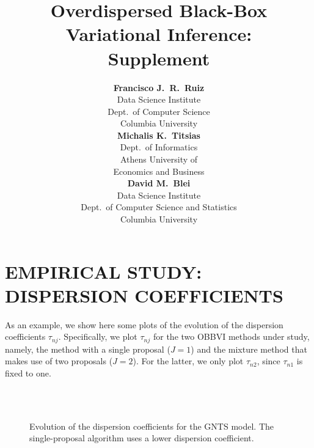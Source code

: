 \documentclass[]{article}
\title{Overdispersed Black-Box Variational Inference:\\Supplement}
\author{%
{\bf Francisco J.~R.~Ruiz} \\
Data Science Institute \\
Dept.~of Computer Science\\
Columbia University\\
\And
{\bf Michalis K.~Titsias}  \\
Dept.~of Informatics\\
Athens University of\\Economics and Business  \\
\And
{\bf David M.~Blei}   \\
Data Science Institute \\
Dept.~of Computer Science and Statistics    \\
Columbia University\\
}
\begin{document}
\maketitle


\section{EMPIRICAL STUDY: DISPERSION COEFFICIENTS}

As an example, we show here some plots of the evolution of the dispersion coefficients $\tau_{nj}$. Specifically, we plot $\tau_{nj}$ for the two \gls{OBBVI} methods under study, namely, the method with a single proposal ($J=1$) and the mixture method that makes use of two proposals ($J=2$). For the latter, we only plot $\tau_{n2}$, since $\tau_{n1}$ is fixed to one.

\begin{figure}[h]
  \centering
  \\
  \\
  \caption{Evolution of the dispersion coefficients for the \gls{GNTS} model. The single-proposal algorithm uses a lower dispersion coefficient.\label{fig:gamNormTS_tau}}
\end{figure}
\end{document}
